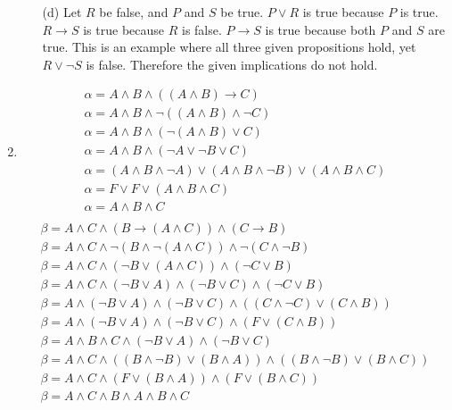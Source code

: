 \documentclass[fleqn]{article}
\begin{document}
\begin{enumerate}
\begin{enumerate}
		\item[(d)]
		Let \(R\) be false, and \(P\) and \(S\) be true. \(P \lor R\) is true because \(P\) is true. \(R \rightarrow S\) is true because \(R\) is false. \(P \rightarrow S\) is true because both \(P\) and \(S\) are true. This is an example where all three given propositions hold, yet \(R \lor \lnot S\) is false. Therefore the given implications do not hold.
	\end{enumerate}

	\item %
	\begin{gather*}
		\alpha = A \land B \land ((A \land B) \rightarrow C) \\
		\alpha = A \land B \land \lnot((A \land B) \land \lnot C) \\
		\alpha = A \land B \land (\lnot(A \land B) \lor C) \\
		\alpha = A \land B \land (\lnot A \lor \lnot B \lor C) \\
		\alpha = (A \land B \land \lnot A) \lor (A \land B \land \lnot B) \lor (A \land B \land C) \\
		\alpha = F \lor F \lor (A \land B \land C) \\
		\alpha = A \land B \land C \\
	\end{gather*}
	\begin{gather*}
		\beta = A \land C \land (B \rightarrow (A \land C)) \land (C \rightarrow B) \\
		\beta = A \land C \land \lnot (B \land \lnot (A \land C)) \land \lnot (C \land \lnot B) \\
		\beta = A \land C \land (\lnot B \lor (A \land C)) \land (\lnot C \lor B) \\
		\beta = A \land C \land (\lnot B \lor A) \land (\lnot B \lor C) \land (\lnot C \lor B) \\
		\beta = A \land (\lnot B \lor A) \land (\lnot B \lor C) \land ((C \land \lnot C) \lor (C \land B)) \\
		\beta = A \land (\lnot B \lor A) \land (\lnot B \lor C) \land (F \lor (C \land B)) \\
		\beta = A \land B \land C \land (\lnot B \lor A) \land (\lnot B \lor C) \\
		\beta = A \land C \land ((B \land \lnot B) \lor (B \land A)) \land ((B \land \lnot B) \lor (B \land C)) \\
		\beta = A \land C \land (F \lor (B \land A)) \land (F \lor (B \land C)) \\
		\beta = A \land C \land B \land A \land B \land C \\

\end{gather*}
\end{enumerate}
\end{document}
